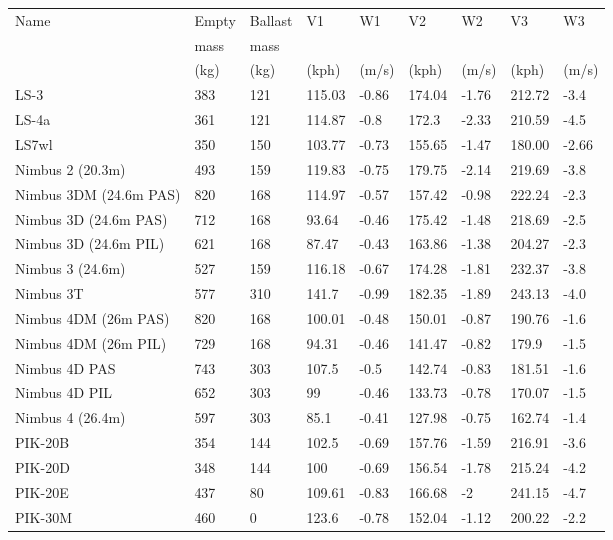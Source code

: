 \begin{maxipage}
\begin{small}
\begin{longtable}{l l l l l l l l l}
\toprule
Name & Empty & Ballast & V1 & W1 & V2 & W2 & V3 & W3 \\
     & mass       & mass         &  &  &  &  &  &  \\
     & (kg)       & (kg)         & (kph) & (m/s) & (kph) & (m/s) & (kph) & (m/s) \\
\midrule
LS-3 & 383 & 121 & 115.03 & -0.86 & 174.04 & -1.76 & 212.72 & -3.4 \\
LS-4a & 361 & 121 & 114.87 & -0.8 & 172.3 & -2.33 & 210.59 & -4.5 \\
LS7wl & 350 & 150 & 103.77 & -0.73 & 155.65 & -1.47 & 180.00 & -2.66 \\
Nimbus 2 (20.3m) & 493 & 159 & 119.83 & -0.75 & 179.75 & -2.14 & 219.69 & -3.8 \\
Nimbus 3DM (24.6m PAS) & 820 & 168 & 114.97 & -0.57 & 157.42 & -0.98 & 222.24 & -2.3 \\
Nimbus 3D (24.6m PAS) & 712 & 168 & 93.64 & -0.46 & 175.42 & -1.48 & 218.69 & -2.5 \\
Nimbus 3D (24.6m PIL) & 621 & 168 & 87.47 & -0.43 & 163.86 & -1.38 & 204.27 & -2.3 \\
Nimbus 3 (24.6m) & 527 & 159 & 116.18 & -0.67 & 174.28 & -1.81 & 232.37 & -3.8 \\
Nimbus 3T & 577 & 310 & 141.7 & -0.99 & 182.35 & -1.89 & 243.13 & -4.0 \\
Nimbus 4DM (26m PAS) & 820 & 168 & 100.01 & -0.48 & 150.01 & -0.87 & 190.76 & -1.6 \\
Nimbus 4DM (26m PIL) & 729 & 168 & 94.31 & -0.46 & 141.47 & -0.82 & 179.9 & -1.5 \\
Nimbus 4D PAS & 743 & 303 & 107.5 & -0.5 & 142.74 & -0.83 & 181.51 & -1.6 \\
Nimbus 4D PIL & 652 & 303 & 99 & -0.46 & 133.73 & -0.78 & 170.07 & -1.5 \\
Nimbus 4 (26.4m) & 597 & 303 & 85.1 & -0.41 & 127.98 & -0.75 & 162.74 & -1.4 \\
PIK-20B & 354 & 144 & 102.5 & -0.69 & 157.76 & -1.59 & 216.91 & -3.6 \\
PIK-20D & 348 & 144 & 100 & -0.69 & 156.54 & -1.78 & 215.24 & -4.2 \\
PIK-20E & 437 & 80 & 109.61 & -0.83 & 166.68 & -2 & 241.15 & -4.7 \\
PIK-30M & 460 & 0 & 123.6 & -0.78 & 152.04 & -1.12 & 200.22 & -2.2 \\

\end{longtable}
\end{small}
\end{maxipage}
